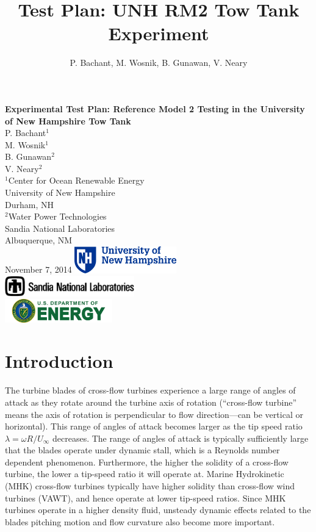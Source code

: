 \documentclass[12pt]{scrreprt}
\author{P. Bachant, M. Wosnik, B. Gunawan, V. Neary}
\title{Test Plan: UNH RM2 Tow Tank Experiment}
\begin{document}
\begin{titlepage}
    \centering
    \vfill
    {\bfseries\Large
        Experimental Test Plan: Reference Model 2 Testing in the University
        of New Hampshire Tow Tank\\
    }  
            \vskip2cm
            P. Bachant$^1$\\
            M. Wosnik$^1$\\
            B. Gunawan$^2$\\
            V. Neary$^2$\\  
    \vfill
    $^1$Center for Ocean Renewable Energy \\
    University of New Hampshire \\
    Durham, NH \\
    \vspace{0.1in}
    $^2$Water Power Technologies \\
    Sandia National Laboratories \\
    Albuquerque, NM \\
    \vfill
    November 7, 2014
    \vfill
    \includegraphics[width=0.33\textwidth]{Figures/unhlogo} \\
    \vspace{0.1in}
    \includegraphics[width=0.42\textwidth]{Figures/snllogo} \\
    \vspace{0.1in}
    \includegraphics[width=0.35\textwidth]{Figures/doelogo}
\end{titlepage}

\tableofcontents

\chapter{Introduction}

The turbine blades of cross-flow turbines experience a large range of angles of
attack as they rotate around the turbine axis of rotation (``cross-flow
turbine'' means the axis of rotation is perpendicular to flow direction---can be
vertical or horizontal).  This range of angles of attack becomes larger as the
tip speed ratio $\lambda=\omega R/U_\infty$  decreases.  The range of angles of
attack is typically sufficiently large that the blades operate under dynamic
stall, which is a Reynolds number dependent phenomenon. Furthermore, the higher
the solidity of a cross-flow turbine, the lower a tip-speed ratio it will
operate at. Marine Hydrokinetic (MHK) cross-flow turbines typically have higher
solidity than cross-flow wind turbines (VAWT), and hence operate at lower
tip-speed ratios. Since MHK turbines operate in a higher density fluid, unsteady
dynamic effects related to the blades pitching motion and flow curvature also
become more important.
\end{document}
